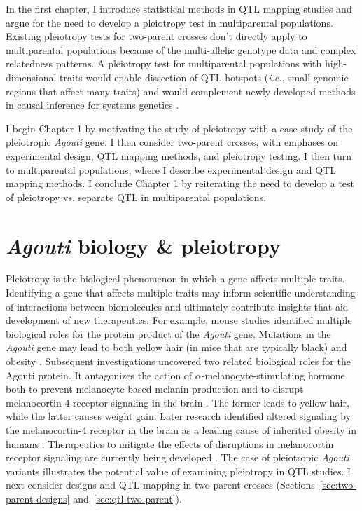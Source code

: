 \documentclass[oneside]{book}\usepackage[]{graphicx}\usepackage[]{color}
\begin{document}
In the first chapter, I introduce statistical methods in QTL 
mapping studies and argue for the need to develop a pleiotropy test
in multiparental populations. Existing pleiotropy tests for two-parent
crosses don't directly apply to multiparental populations because of the
multi-allelic genotype data and complex relatedness patterns.
A pleiotropy test for multiparental populations with high-dimensional
traits would enable dissection of QTL hotspots (\emph{i.e.}, small 
genomic regions that affect many traits) and would complement newly 
developed methods in causal inference for systems genetics \citep{chick2016defining}.


I begin Chapter 1 by motivating the study of
pleiotropy with a case study of the pleiotropic \emph{Agouti} gene.
I then consider two-parent crosses, with emphases on experimental design,
QTL mapping methods, and pleiotropy testing. 
I then turn to multiparental populations, where I describe experimental
design and QTL mapping
methods. I conclude Chapter 1 by reiterating the need to develop a
test of pleiotropy vs. separate QTL in multiparental populations.




\section{\emph{Agouti} biology \& pleiotropy}
Pleiotropy is the biological phenomenon in which a gene affects multiple traits. 
Identifying a gene that affects multiple traits may inform scientific understanding of
interactions between biomolecules and ultimately contribute insights that aid development
of new therapeutics. 
For example, mouse studies identified multiple biological roles for the protein product of 
the \emph{Agouti} gene. Mutations in the \emph{Agouti} gene may lead to both 
yellow hair (in mice that are typically black) and obesity \citep{attie2017how}.
Subsequent investigations uncovered two related biological roles for the Agouti protein.
It antagonizes the action of $\alpha$-melanocyte-stimulating hormone both to
prevent melanocyte-based melanin production and to disrupt melanocortin-4
receptor signaling in the brain \citep{lu1994agouti,klebig1995ectopic,huszar1997targeted}.
The former leads to yellow hair, while the latter causes weight gain.
Later research identified altered signaling by the melanocortin-4 receptor in
the brain as a leading cause of inherited obesity in humans \citep{farooqi2003clinical,vaisse2000melanocortin}.
Therapeutics to mitigate the effects of disruptions in melanocortin receptor signaling are
currently being developed \citep{macneil2002role,fani2014melanocortin}.
The case of pleiotropic \emph{Agouti} variants illustrates the potential value of examining pleiotropy in QTL studies.
I next consider designs and QTL mapping in two-parent crosses (Sections~\ref{sec:two-parent-designs} and~\ref{sec:qtl-two-parent}).
\end{document}
